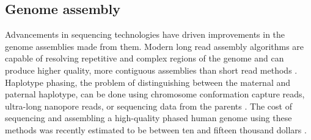 \documentclass[11pt]{ucscthesis}
\begin{document}






\subsection{Genome assembly}

Advancements in sequencing technologies have driven improvements in the genome assemblies made from them.
Modern long read assembly algorithms are capable of resolving repetitive and complex regions of the genome and can produce higher quality, more contiguous assemblies than short read methods \cite{cheng_hifiasm_2021,rautiainen_verkko_2023,shafin_shasta_2020}.
Haplotype phasing, the problem of distinguishing between the maternal and paternal haplotype, can be done using chromosome conformation capture reads, ultra-long nanopore reads, or sequencing data from the parents \cite{cheng_hifiasm_2021}.
The cost of sequencing and assembling a high-quality phased human genome using these methods was recently estimated to be between ten and fifteen thousand dollars \cite{miga_envisioning_2023}.
\end{document}
